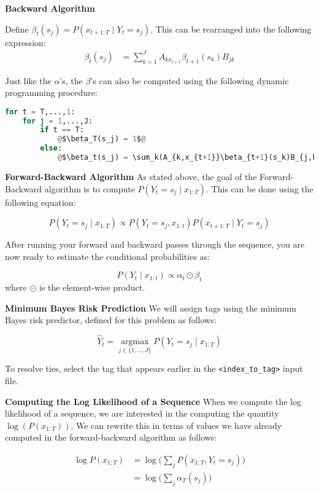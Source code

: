 \documentclass[11pt,addpoints,answers]{exam}
\newcommand \argmax {\operatorname*{argmax}}
\begin{document}
\vspace{0.2 in}
\textbf{Backward Algorithm}

Define $\beta_t(s_j) = P(x_{t+1:T} \mid Y_t=s_j)$. This can be rearranged into the following expression:
\begin{align}
    \label{eqn:beta}
    \beta_t(s_j) &= \sum_{k=1}^J A_{kx_{t+1}}\beta_{t+1}(s_k)B_{jk}
\end{align}


Just like the $\alpha$'s, the $\beta$'s can also be computed using the following dynamic programming procedure:

\begin{lstlisting}[language=Python,escapechar=@]
for t = T,...,1:
    for j = 1,...,J:
        if t == T:
            @$\beta_T(s_j) = 1$@
        else:
            @$\beta_t(s_j) = \sum_k(A_{k,x_{t+1}}\beta_{t+1}(s_k)B_{j,k})$@
\end{lstlisting}

\clearpage
\textbf{Forward-Backward Algorithm}
As stated above, the goal of the Forward-Backward algorithm is to compute $P(Y_t =s_j \mid x_{1:T})$. This can be done using the following equation:

$$P(Y_t =s_j \mid x_{1:T}) \propto P(Y_t=s_j, x_{1:t})P(x_{t+1:T} \mid Y_t=s_j) $$

After running your forward and backward passes through the sequence, you are now ready to estimate the conditional probabilities as:

$$P(Y_t \mid x_{1:t}) \propto \alpha_t\odot\beta_t$$
where $\odot$ is the element-wise product.

\vspace{0.4 in}
\textbf{Minimum Bayes Risk Prediction}
We will assign tags using the minimum Bayes risk predictor, defined for this problem as follows:

$$\hat{Y}_t = \argmax_{j\in \{1,\dots,J\}} P(Y_t = s_j \mid x_{1:T})$$

To resolve ties, select the tag that appears earlier in the \texttt{<index\_to\_tag>} input file.

\textbf{Computing the Log Likelihood of a Sequence}
When we compute the log likelihood of a sequence, we are interested in the computing the quantity $\log(P(x_{1:T}))$. We can rewrite this in terms of values we have already computed in the forward-backward algorithm as follows:

\begin{align*}
    \log{P(x_{1:T})} &= \log{\big(\sum_j P(x_{1:T},Y_t=s_j)\big)}\\
    &= \log{\big(\sum_j \alpha_T(s_j)\big)}
\end{align*}
\end{document}
